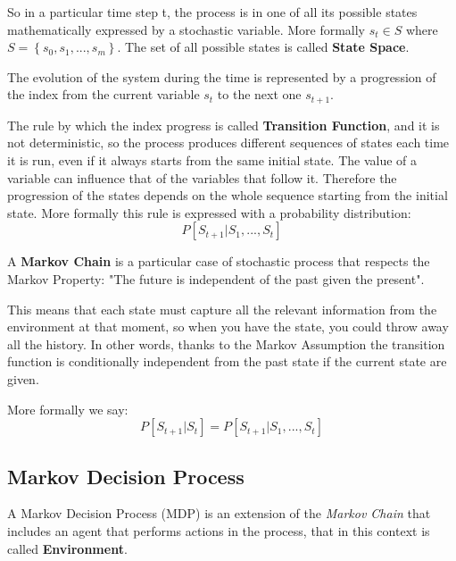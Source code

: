 So in a particular time step t, the process is in one of all its possible states mathematically expressed by a stochastic variable.
More formally $s_t \in S$ where $S = \left\{ s_0,s_1, ... , s_m \right\} $.
The set of all possible states is called \textbf{State Space}.

The evolution of the system during the time is represented by a progression of the index from the current variable $s_t$ to the next one $s_{t+1}$.

The rule by which the index progress is called  \textbf{Transition Function}, and it is not deterministic, so the process produces different sequences of states each time it is run, even if it always starts from the same initial state.
The value of a variable can influence that of the variables that follow it. 
Therefore the progression of the states depends on the whole sequence starting from the initial state.
More formally this rule is expressed with a probability distribution: $$ P[S_{t+1} | S_1, ..., S_t] $$



A \textbf{Markov Chain} is a particular case of stochastic process that respects the Markov Property: "The future is independent of the past given the present".

This means that each state must capture all the relevant information from the environment at that moment, so when you have the state, you could throw away all the history.
In other words, thanks to the Markov Assumption the transition function is conditionally independent from the past state if the current state are given.

More formally we say:
\begin{equation*}
    P[S_{t+1} | S_t] = P[S_{t+1} | S_1, ..., S_t] 
\end{equation*}    


\subsection{Markov Decision Process}
A Markov Decision Process (MDP) is an extension of the \textit{Markov Chain} that includes an agent that performs actions in the process, that in this context is called \textbf{Environment}.


